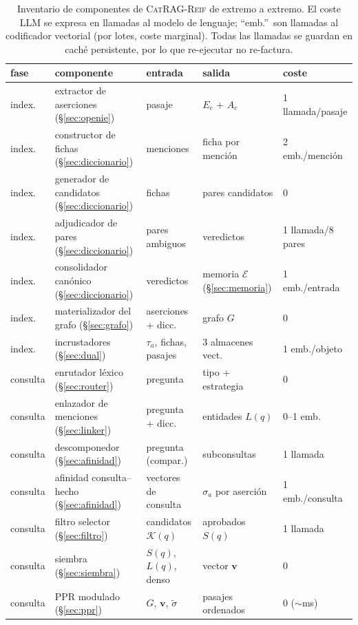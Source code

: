 \documentclass[11pt,a4paper]{article}
\newcommand{\sys}{\textsc{CatRAG-Reif}}          %
\begin{document}
\begin{table}[t]
\centering\footnotesize\setlength{\tabcolsep}{3.5pt}
\caption{Inventario de componentes de \sys{} de extremo a extremo. El coste
LLM se expresa en llamadas al modelo de lenguaje; ``emb.''\ son llamadas al
codificador vectorial (por lotes, coste marginal). Todas las llamadas se
guardan en caché persistente, por lo que re-ejecutar no re-factura.}
\label{tab:componentes}
\setlength{\tabcolsep}{3pt}
\begin{tabular}{lllll}
\toprule
fase & componente & entrada & salida & coste\\
\midrule
index. & extractor de aserciones (\S\ref{sec:openie}) & pasaje & $E_c$ + $A_c$ & 1 llamada/pasaje\\
index. & constructor de fichas (\S\ref{sec:diccionario}) & menciones & ficha por mención & 2 emb./mención\\
index. & generador de candidatos (\S\ref{sec:diccionario}) & fichas & pares candidatos & 0\\
index. & adjudicador de pares (\S\ref{sec:diccionario}) & pares ambiguos & veredictos & 1 llamada/8 pares\\
index. & consolidador canónico (\S\ref{sec:diccionario}) & veredictos & memoria $\mathcal{E}$ (\S\ref{sec:memoria}) & 1 emb./entrada\\
index. & materializador del grafo (\S\ref{sec:grafo}) & aserciones + dicc. & grafo $G$ & 0\\
index. & incrustadores (\S\ref{sec:dual}) & $\tau_a$, fichas, pasajes & 3 almacenes vect. & 1 emb./objeto\\
\midrule
consulta & enrutador léxico (\S\ref{sec:router}) & pregunta & tipo + estrategia & 0\\
consulta & enlazador de menciones (\S\ref{sec:linker}) & pregunta + dicc. & entidades $L(q)$ & 0--1 emb.\\
consulta & descomponedor (\S\ref{sec:afinidad}) & pregunta (compar.) & subconsultas & 1 llamada\\
consulta & afinidad consulta--hecho (\S\ref{sec:afinidad}) & vectores de consulta & $\sigma_a$ por aserción & 1 emb./consulta\\
consulta & filtro selector (\S\ref{sec:filtro}) & candidatos $\mathcal{K}(q)$ & aprobados $S(q)$ & 1 llamada\\
consulta & siembra (\S\ref{sec:siembra}) & $S(q)$, $L(q)$, denso & vector $\mathbf{v}$ & 0\\
consulta & PPR modulado (\S\ref{sec:ppr}) & $G$, $\mathbf{v}$, $\tilde\sigma$ & pasajes ordenados & 0 ($\sim$ms)\\
\bottomrule
\end{tabular}
\end{table}
\end{document}
